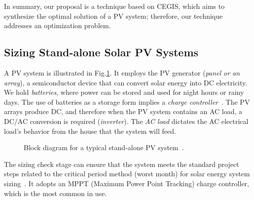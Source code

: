 \documentclass[10pt,journal,compsoc]{IEEEtran}
\begin{document}
In summary, our proposal is a technique based on CEGIS, which aims to synthesize the optimal solution of a PV system; therefore, our technique addresses an optimization problem.

\subsection{Sizing Stand-alone Solar PV Systems}
\label{sec:sizing}

A PV system is illustrated in Fig.\ref{fig:blockdiagram}. It employs the PV generator (\textit{panel or an array}), a semiconductor device that can convert solar energy into DC electricity. We hold \textit{batteries}, where power can be stored and used for night hours or rainy days. The use of batteries as a storage form implies a \textit{charge controller}~\cite{Hansen}. The PV arrays produce DC, and therefore when the PV system contains an AC load, a DC/AC conversion is required (\textit{inverter}). The \textit{AC load} dictates the AC electrical load's behavior from the house that the system will feed.
%
\begin{figure}[h]
\centering
\caption{Block diagram for a typical stand-alone PV system~\cite{Hansen}.}
\label{fig:blockdiagram} 
\end{figure}

The sizing check stage can ensure that the system meets the standard project steps related to the critical period method (worst month) for solar energy system sizing~\cite{Pinho}. It adopts an MPPT (Maximum Power Point Tracking) charge controller, which is the most common in use. 
\end{document}
